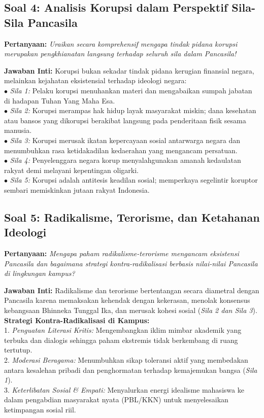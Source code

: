 \documentclass[10pt,a4paper]{article}
\begin{document}
\subsection{Soal 4: Analisis Korupsi dalam Perspektif Sila-Sila Pancasila}
\textbf{Pertanyaan:} \textit{Uraikan secara komprehensif mengapa tindak pidana korupsi merupakan pengkhianatan langsung terhadap seluruh sila dalam Pancasila!}
\begin{conceptbox}
\textbf{Jawaban Inti:} Korupsi bukan sekadar tindak pidana kerugian finansial negara, melainkan kejahatan eksistensial terhadap ideologi negara:\\
$\bullet$ \textit{Sila 1:} Pelaku korupsi menuhankan materi dan mengabaikan sumpah jabatan di hadapan Tuhan Yang Maha Esa.\\
$\bullet$ \textit{Sila 2:} Korupsi merampas hak hidup layak masyarakat miskin; dana kesehatan atau bansos yang dikorupsi berakibat langsung pada penderitaan fisik sesama manusia.\\
$\bullet$ \textit{Sila 3:} Korupsi merusak ikatan kepercayaan sosial antarwarga negara dan menumbuhkan rasa ketidakadilan kedaerahan yang mengancam persatuan.\\
$\bullet$ \textit{Sila 4:} Penyelenggara negara korup menyalahgunakan amanah kedaulatan rakyat demi melayani kepentingan oligarki.\\
$\bullet$ \textit{Sila 5:} Korupsi adalah antitesis keadilan sosial; memperkaya segelintir koruptor sembari memiskinkan jutaan rakyat Indonesia.
\end{conceptbox}

\subsection{Soal 5: Radikalisme, Terorisme, dan Ketahanan Ideologi}
\textbf{Pertanyaan:} \textit{Mengapa paham radikalisme-terorisme mengancam eksistensi Pancasila dan bagaimana strategi kontra-radikalisasi berbasis nilai-nilai Pancasila di lingkungan kampus?}
\begin{conceptbox}
\textbf{Jawaban Inti:} Radikalisme dan terorisme bertentangan secara diametral dengan Pancasila karena memaksakan kehendak dengan kekerasan, menolak konsensus kebangsaan Bhinneka Tunggal Ika, dan merusak kohesi sosial (\textit{Sila 2 dan Sila 3}).\\
\textbf{Strategi Kontra-Radikalisasi di Kampus:}\\
1. \textit{Penguatan Literasi Kritis:} Mengembangkan iklim mimbar akademik yang terbuka dan dialogis sehingga paham ekstremis tidak berkembang di ruang tertutup.\\
2. \textit{Moderasi Beragama:} Menumbuhkan sikap toleransi aktif yang membedakan antara kesalehan pribadi dan penghormatan terhadap kemajemukan bangsa (\textit{Sila 1}).\\
3. \textit{Keterlibatan Sosial \& Empati:} Menyalurkan energi idealisme mahasiswa ke dalam pengabdian masyarakat nyata (PBL/KKN) untuk menyelesaikan ketimpangan sosial riil.
\end{conceptbox}
\end{document}
